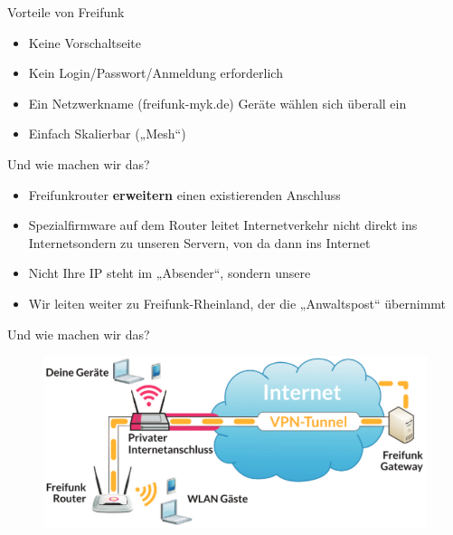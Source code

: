 \documentclass{beamer}
\begin{document}
\begin{frame}{Vorteile von Freifunk}
\begin{itemize}
\item Keine Vorschaltseite
\item Kein Login/Passwort/Anmeldung erforderlich
\item Ein Netzwerkname (freifunk-myk.de) Geräte wählen sich überall ein 
\item Einfach Skalierbar („Mesh“)
\end{itemize}
\end{frame}

\begin{frame}{Und wie machen wir das?}
\begin{itemize}
\item Freifunkrouter \textbf{erweitern} einen existierenden Anschluss
\item Spezialfirmware auf dem Router leitet Internetverkehr nicht direkt ins \glqq Internet\grqq sondern zu unseren Servern, von da dann ins Internet
\item Nicht Ihre IP steht im „Absender“, sondern unsere
\item Wir leiten weiter zu Freifunk-Rheinland, der die „Anwaltspost“ übernimmt
\end{itemize}
\end{frame}

\begin{frame}{Und wie machen wir das?}
\begin{figure}
\centering
\includegraphics[width=1.0\linewidth]{Bilder/VPN}
\label{fig:vpn}
\end{figure}
\end{frame}
\end{document}
